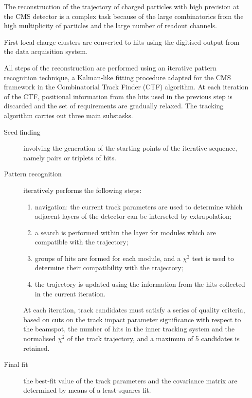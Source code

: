 The reconstruction of the trajectory of charged particles with high precision at the CMS detector
is a complex task because of the large combinatorics from the high multiplicity of particles and the large number of readout channels.

First local charge clusters are converted to hits using the digitised output from the data acquisition system.

All steps of the reconstruction are performed using an iterative pattern recognition technique,
a Kalman-like fitting procedure adapted for the CMS framework in the Combinatorial Track Finder \cite{billoir.qian:simultaneous, Speer:2005dp} (CTF) algorithm.
At each iteration of the CTF, positional information from the hits used in the previous step is discarded and the set of requirements are gradually relaxed.
The tracking algorithm carries out three main substasks.
\begin{description}
\item[Seed finding] involving the generation of the starting points of the iterative sequence, namely pairs or triplets of hits.
\item[Pattern recognition] iteratively performs the following steps:
  \begin{enumerate}
  \item navigation: the current track parameters are used to determine which adjacent layers of the detector can be interseted by extrapolation;
  \item a search is performed within the layer for modules which are compatible with the trajectory;
  \item groups of hits are formed for each module, and a $\chi^2$ test is used to determine their compatibility with the trajectory;
  \item the trajectory is updated using the information from the hits collected in the current iteration.
  \end{enumerate}
  At each iteration, track candidates must satisfy a series of quality criteria, based on cuts on the track impact parameter significance with respect to the beamspot, the number of hits in the inner tracking system and the normalised $\chi^2$ of the track trajectory, and a maximum of 5 candidates is retained.
\item[Final fit] the best-fit value of the track parameters and the covariance matrix are determined by means of a least-squares fit.
\end{description}

